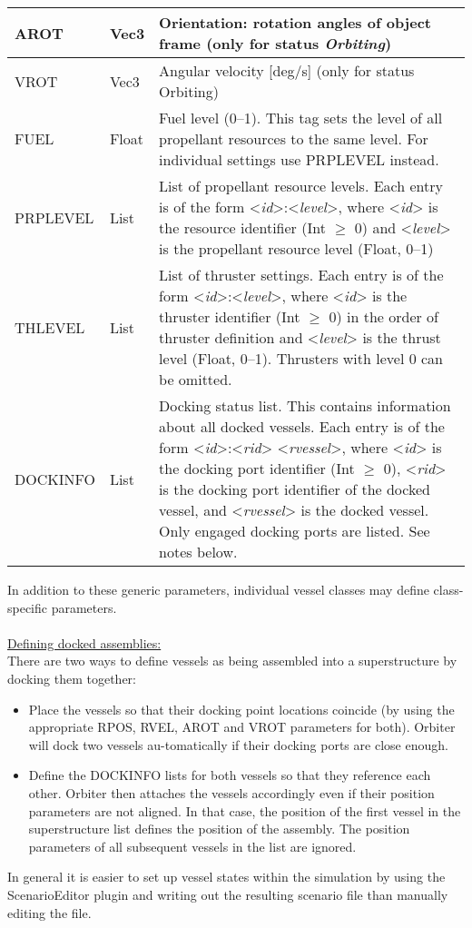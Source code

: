 \documentclass[Orbiter Developer Manual.tex]{subfiles}
\begin{document}
\begin{table}[H]
\begin{tabularx}{\textwidth}{ |l|l|X| }
	\hline\rule{0pt}{2ex}
	AROT & Vec3 & Orientation: rotation angles of object frame (only for status \textit{Orbiting})\\
	\hline\rule{0pt}{2ex}
	VROT & Vec3 & Angular velocity [deg/s] (only for status Orbiting)\\
	\hline\rule{0pt}{2ex}
	FUEL & Float & Fuel level (0–1). This tag sets the level of all propellant resources to the same level. For individual settings use PRPLEVEL instead.\\
	\hline\rule{0pt}{2ex}
	PRPLEVEL & List & List of propellant resource levels. Each entry is of the form <\textit{id}>:<\textit{level}>, where <\textit{id}> is the resource identifier (Int $\geq$ 0) and <\textit{level}> is the propellant resource level (Float, 0–1)\\
	\hline\rule{0pt}{2ex}
	THLEVEL & List & List of thruster settings. Each entry is of the form <\textit{id}>:<\textit{level}>, where <\textit{id}> is the thruster identifier (Int $\geq$ 0) in the order of thruster definition and <\textit{level}> is the thrust level (Float, 0–1). Thrusters with level 0 can be omitted.\\
	\hline\rule{0pt}{2ex}
	DOCKINFO & List & Docking status list. This contains information about all docked vessels. Each entry is of the form <\textit{id}>:<\textit{rid}> <\textit{rvessel}>, where <\textit{id}> is the docking port identifier (Int $\geq$ 0), <\textit{rid}> is the docking port identifier of the docked vessel, and <\textit{rvessel}> is the docked vessel. Only engaged docking ports are listed. See notes below.\\
	\hline
	\end{tabularx}
\end{table}

\noindent
In addition to these generic parameters, individual vessel classes may define class-specific parameters.\\
\\
\underline{Defining docked assemblies:}\\
There are two ways to define vessels as being assembled into a superstructure by docking them together:

\begin{itemize}
\item Place the vessels so that their docking point locations coincide (by using the appropriate RPOS, RVEL, AROT and VROT parameters for both). Orbiter will dock two vessels au-tomatically if their docking ports are close enough.
\item Define the DOCKINFO lists for both vessels so that they reference each other. Orbiter then attaches the vessels accordingly even if their position parameters are not aligned. In that case, the position of the first vessel in the superstructure list defines the position of the assembly. The position parameters of all subsequent vessels in the list are ignored.
\end{itemize}

\noindent
In general it is easier to set up vessel states within the simulation by using the ScenarioEditor plugin and writing out the resulting scenario file than manually editing the file.
\end{document}
